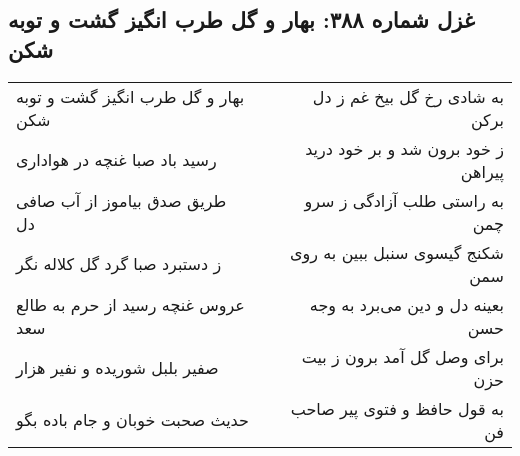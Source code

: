 \begin{center}
\section*{غزل شماره ۳۸۸: بهار و گل طرب انگیز گشت و توبه شکن}
\label{sec:sh388}
\begin{longtable}{l p{0.5cm} r}
بهار و گل طرب انگیز گشت و توبه شکن
&&
به شادی رخ گل بیخ غم ز دل برکن
\\
رسید باد صبا غنچه در هواداری
&&
ز خود برون شد و بر خود درید پیراهن
\\
طریق صدق بیاموز از آب صافی دل
&&
به راستی طلب آزادگی ز سرو چمن
\\
ز دستبرد صبا گرد گل کلاله نگر
&&
شکنج گیسوی سنبل ببین به روی سمن
\\
عروس غنچه رسید از حرم به طالع سعد
&&
بعینه دل و دین می‌برد به وجه حسن
\\
صفیر بلبل شوریده و نفیر هزار
&&
برای وصل گل آمد برون ز بیت حزن
\\
حدیث صحبت خوبان و جام باده بگو
&&
به قول حافظ و فتوی پیر صاحب فن
\\
\end{longtable}
\end{center}
